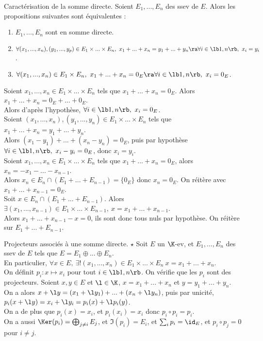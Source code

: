 \documentclass[11pt]{article}
\begin{document}
\begin{prop}{Caractérisation de la somme directe.}{}
    Soient $E_1,...,E_n$ des ssev de $E$. Alors les propositions suivantes sont équivalentes :
    \begin{enumerate}
        \item $E_1,...,E_n$ sont en somme directe.
        \item $\forall (x_1,...,x_n),(y_1,...,y_p)\in E_1\times...\times E_n, ~ x_1+...+x_n=y_1+...+y_n \ra \forall i \in \lb1,n\rb, ~ x_i=y_i$.
        \item $\forall (x_1,...,x_n)\in E_1\times E_n, ~ x_1+...+x_n=0_E \ra \forall i \in \lb1,n\rb, ~ x_i = 0_E$.
    \end{enumerate}
    \tcblower
     Soient $x_1,...,x_n\in E_1\times...\times E_n$ tels que $x_1+...+x_n=0_E$. Alors $x_1+...+x_n=0_E+...+0_E$.\\
    Alors d'après l'hypothèse, $\forall i \in \lb1,n\rb, ~ x_i=0_E$.\\
     Soient $(x_1,...,x_n),(y_1,...,y_n)\in E_1\times...\times E_n$ tels que $x_1+...+x_n=y_1+...+y_n$.\\
    Alors $(x_1-y_1)+...+(x_n-y_n)=0_E$, puis par hypothèse $\forall i \in \lb1,n\rb, ~ x_i-y_i=0_E$, donc $x_i=y_i$.\\
     Soient $x_1,...,x_n\in E_1\times...\times E_n$ tels que $x_1+...+x_n=0_E$, alors $x_n=-x_1-...-x_{n-1}$.\\
    Alors $x_n\in E_n \cap (E_1+...+E_{n-1})=\{0_E\}$ donc $x_n = 0_E$. On réitère avec $x_1+...+x_{n-1}=0_E$.\\
     Soit $x\in E_n\cap (E_1+...+E_{n-1})$. Alors $\exists (x_1,...,x_{n-1})\in E_1\times...\times E_{n-1}, ~ x = x_1+...+x_{n-1}$.\\
    Alors $x_1+...+x_{n-1}-x=0$, ils sont donc tous nuls par hypothèse. On réitère sur $E_1+...+E_{n-1}$.
\end{prop}

\vspace*{-0.8cm}

\begin{defi}{Projecteurs associés à une somme directe. $\star$}{}
    Soit $E$ un $\K$-ev, et $E_1,...,E_n$ des ssev de $E$ tels que $E=E_1\oplus...\oplus E_n$.\\
    En particulier, $\forall x \in E, ~ \exists!(x_1,...,x_n)\in E_1\times...\times E_n ~ x=x_1+...+x_n$.\\
    On définit $p_i:x\mapsto x_i$ pour tout $i\in\lb1,n\rb$.
    \tcblower
    On vérifie que les $p_i$ sont des projecteurs. Soient $x,y\in E$ et $\l\in\K$, $x=x_1+...+x_n$ et $y=y_1+...+y_n$.\\
    On a alors $x+\l y = (x_1+\l y_1)+...+(x_n+\l y_n)$, puis par unicité, $p_i(x+\l y)=x_i+\l y_i = p_i(x)+\l p_i(y)$.\\
    On a de plus que $p_i(x)=x_i$, et $p_i(x_i)=x_i$ donc $p_i\circ p_i = p_i$.\\
    On a aussi $\Ker(p_i)=\bigoplus_{j\neq i}E_j$, et $\Im(p_i)=E_i$, et $\sum_ip_i=\id_E$, et $p_i\circ p_j = 0$ pour $i\neq j$.
\end{defi}
\end{document}

